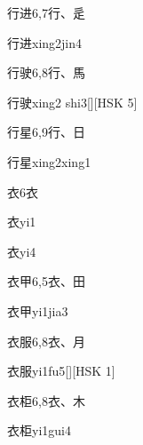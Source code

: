 \begin{entry}{行进}{6,7}{⾏、⾡}
  \begin{phonetics}{行进}{xing2jin4}
  \end{phonetics}
\end{entry}

\begin{entry}{行驶}{6,8}{⾏、⾺}
  \begin{phonetics}{行驶}{xing2 shi3}[][HSK 5]
  \end{phonetics}
\end{entry}

\begin{entry}{行星}{6,9}{⾏、⽇}
  \begin{phonetics}{行星}{xing2xing1}
  \end{phonetics}
\end{entry}

\begin{entry}{衣}{6}{⾐}
  \begin{phonetics}{衣}{yi1}
  \end{phonetics}
  \begin{phonetics}{衣}{yi4}
  \end{phonetics}
\end{entry}

\begin{entry}{衣甲}{6,5}{⾐、⽥}
  \begin{phonetics}{衣甲}{yi1jia3}
  \end{phonetics}
\end{entry}

\begin{entry}{衣服}{6,8}{⾐、⽉}
  \begin{phonetics}{衣服}{yi1fu5}[][HSK 1]
  \end{phonetics}
\end{entry}

\begin{entry}{衣柜}{6,8}{⾐、⽊}
  \begin{phonetics}{衣柜}{yi1gui4}
  \end{phonetics}
\end{entry}


